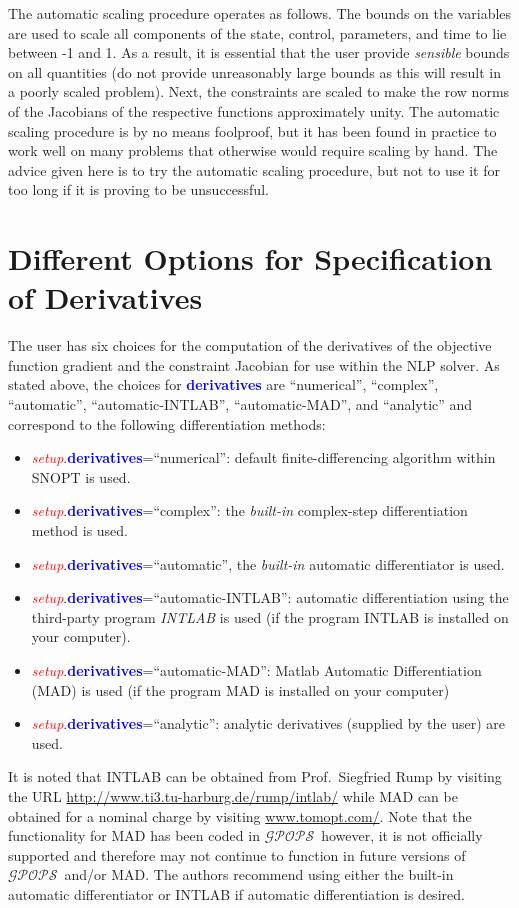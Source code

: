 \documentclass[10pt,final]{report}
\newcommand{\gpops}{$\mathcal{GPOPS}$~}
\newcommand{\bfblue}[1]{\textcolor{blue}{\bf #1}}
\newcommand{\slred}[1]{\textcolor{red}{\sl #1}}
\begin{document}
The automatic scaling procedure operates as follows.  The bounds on the
variables are used to scale all components of the state, control, parameters,
and time to lie between -1 and 1.  As a result, it is essential that the user
provide {\em sensible} bounds on all quantities (\eg do not provide
unreasonably large bounds as this will result in a poorly scaled problem).
Next, the constraints are scaled to make the row norms of the Jacobians of the
respective functions approximately unity.  The automatic scaling procedure is
by no means foolproof, but it has been found in practice to work well on many
problems that otherwise would require scaling by hand.  The advice given here
is to try the automatic scaling procedure, but not to use it for too long if
it is proving to be unsuccessful.

\section{Different Options for Specification of Derivatives\label{sect:_derivatives}}

The user has six choices for the computation of the derivatives of
the objective function gradient and the constraint Jacobian for use
within the NLP solver.  As stated above, the choices for
\bfblue{derivatives} are ``numerical'', ``complex'', ``automatic'', ``automatic-INTLAB'',
``automatic-MAD'', and ``analytic'' and correspond to the following differentiation methods:
\begin{itemize}
\item \slred{setup}.\bfblue{derivatives}=``numerical'':  default
  finite-differencing algorithm within SNOPT is used.
\item \slred{setup}.\bfblue{derivatives}=``complex'': the {\em
    built-in} complex-step differentiation method is used.
\item \slred{setup}.\bfblue{derivatives}=``automatic'', the {\em
    built-in} automatic differentiator is used.
\item \slred{setup}.\bfblue{derivatives}=``automatic-INTLAB'':
  automatic differentiation using the third-party program  {\em
    INTLAB} is used (if the program INTLAB is installed on your computer).
\item \slred{setup}.\bfblue{derivatives}=``automatic-MAD'': Matlab
  Automatic Differentiation (MAD) is used (if the program MAD is
  installed on your computer)
\item \slred{setup}.\bfblue{derivatives}=``analytic'': analytic derivatives
(supplied by the user) are used.
\end{itemize}
It is noted that INTLAB can be obtained from Prof.~Siegfried Rump by
visiting the URL \url{http://www.ti3.tu-harburg.de/rump/intlab/} while
MAD can be obtained for a nominal charge by visiting
\url{www.tomopt.com/}.  Note that the functionality for MAD has been
coded in \gpops however, it is not officially supported and therefore
may not continue to function in future versions of \gpops and/or MAD.
The authors recommend using either the built-in automatic
differentiator or INTLAB if automatic differentiation is desired.
\end{document}
